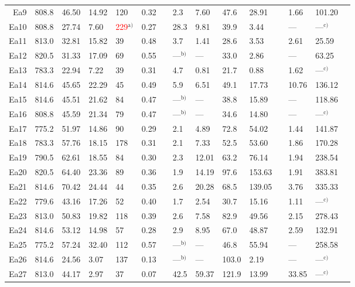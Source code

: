 \documentclass[12pt,onecolumn]{article}
\begin{document}
\begin{landscape}
\begin{table}
{\begin{threeparttable}[t]
\begin{tabular}{rllllllllllllll}
Ea9 & 808.8 & 46.50 & 14.92 &  120 & 0.32 &  &  2.3 & 7.60 & 47.6 & 28.91 &  & 1.66 &101.20 \\ 
Ea10 & 808.8 & 27.74 & 7.60 &  \textcolor{red}{229}$^\text{a)}$ & 0.27 &  & 28.3 & 9.81 & 39.9 & 3.44 &  & --- &---$^\text{c)}$\\ 
Ea11 & 813.0 & 32.81 & 15.82 &   39 & 0.48 &  &  3.7 & 1.41 & 28.6 & 3.53 &  & 2.61 &25.59 \\ 
Ea12 & 820.5 & 31.33 & 17.09 &   69 & 0.55 &  & ---$^\text{b)}$ & --- &33.0 & 2.86 & & --- &63.25 \\ 
Ea13 & 783.3 & 22.94 & 7.22 &   39 & 0.31 &  &  4.7 & 0.81 & 21.7 & 0.88 &  & 1.62 &---$^\text{c)}$\\ 
Ea14 & 814.6 & 45.65 & 22.29 &   45 & 0.49 &  &  5.9 & 6.51 & 49.1 & 17.73 &  & 10.76 &136.12 \\ 
Ea15 & 814.6 & 45.51 & 21.62 &   84 & 0.47 &  & ---$^\text{b)}$ & --- &38.8 & 15.89 & & --- &118.86 \\ 
Ea16 & 808.8 & 45.59 & 21.34 &   79 & 0.47 &  & ---$^\text{b)}$ & --- &34.6 & 14.80 & & --- &---$^\text{c)}$\\ 
Ea17 & 775.2 & 51.97 & 14.86 &   90 & 0.29 &  &  2.1 & 4.89 & 72.8 & 54.02 &  & 1.44 &141.87 \\ 
Ea18 & 783.3 & 57.76 & 18.15 &  178 & 0.31 &  &  2.1 & 7.33 & 52.5 & 53.60 &  & 1.86 &170.28 \\ 
Ea19 & 790.5 & 62.61 & 18.55 &   84 & 0.30 &  &  2.3 & 12.01 & 63.2 & 76.14 &  & 1.94 &238.54 \\ 
Ea20 & 820.5 & 64.40 & 23.36 &   89 & 0.36 &  &  1.9 & 14.19 & 97.6 & 153.63 &  & 1.91 &383.81 \\ 
Ea21 & 814.6 & 70.42 & 24.44 &   44 & 0.35 &  &  2.6 & 20.28 & 68.5 & 139.05 &  & 3.76 &335.33 \\ 
Ea22 & 779.6 & 43.16 & 17.26 &   52 & 0.40 &  &  1.7 & 2.54 & 30.7 & 15.16 &  & 1.11 &---$^\text{c)}$\\ 
Ea23 & 813.0 & 50.83 & 19.82 &  118 & 0.39 &  &  2.6 & 7.58 & 82.9 & 49.56 &  & 2.15 &278.43 \\ 
Ea24 & 814.6 & 53.12 & 14.98 &   57 & 0.28 &  &  2.9 & 8.95 & 67.0 & 48.87 &  & 2.59 &132.91 \\ 
Ea25 & 775.2 & 57.24 & 32.40 &  112 & 0.57 &  & ---$^\text{b)}$ & --- &46.8 & 55.94 & & --- &258.58 \\ 
Ea26 & 814.6 & 24.56 & 3.07 &  137 & 0.13 &  & ---$^\text{b)}$ & --- &103.0 & 2.19 &  & --- &---$^\text{c)}$\\ 
Ea27 & 813.0 & 44.17 & 2.97 &   37 & 0.07 &  & 42.5 & 59.37 & 121.9 & 13.99 &  & 33.85 &---$^\text{c)}$\\ 

\end{tabular}
\end{threeparttable}}
\end{table}
\end{landscape}
\end{document}
